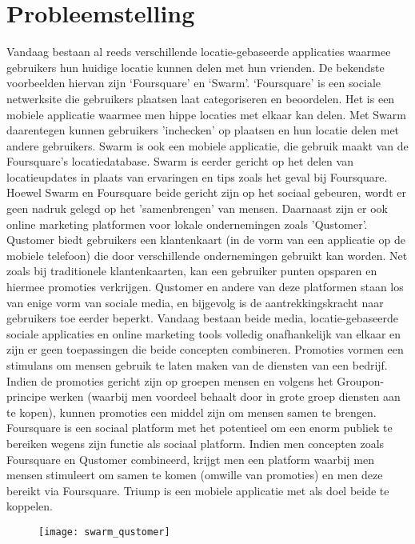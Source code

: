 \chapter{Probleemstelling}
Vandaag bestaan al reeds verschillende locatie-gebaseerde applicaties waarmee gebruikers hun huidige locatie kunnen delen met hun vrienden. De bekendste voorbeelden hiervan zijn ‘Foursquare’ en ‘Swarm’. ‘Foursquare’ is een sociale netwerksite die gebruikers plaatsen laat categoriseren en beoordelen. Het is een mobiele applicatie waarmee men hippe locaties met elkaar kan delen. Met Swarm daarentegen kunnen gebruikers 'inchecken' op plaatsen en hun locatie delen met andere gebruikers. Swarm is ook een mobiele applicatie, die gebruik maakt van de Foursquare's locatiedatabase. Swarm is eerder gericht op het delen van locatieupdates in plaats van ervaringen en tips zoals het geval bij Foursquare.
Hoewel Swarm en Foursquare beide gericht zijn op het sociaal gebeuren, wordt er geen nadruk gelegd op het 'samenbrengen' van mensen. 
Daarnaast zijn er ook online marketing platformen voor lokale ondernemingen zoals 'Qustomer'. Qustomer biedt gebruikers een klantenkaart (in de vorm van een applicatie op de mobiele telefoon) die door verschillende ondernemingen gebruikt kan worden. Net zoals bij traditionele klantenkaarten, kan een gebruiker punten opsparen en hiermee promoties verkrijgen. Qustomer en andere van deze platformen staan los van enige vorm van sociale media, en bijgevolg is de aantrekkingskracht naar gebruikers toe eerder beperkt.
Vandaag bestaan beide media, locatie-gebaseerde sociale applicaties en online marketing tools volledig onafhankelijk van elkaar en zijn er geen toepassingen die beide concepten combineren. 
Promoties vormen een stimulans om mensen gebruik te laten maken van de diensten van een bedrijf. Indien de promoties gericht zijn op groepen mensen en volgens het Groupon-principe werken (waarbij men voordeel behaalt door in grote groep diensten aan te kopen), kunnen promoties een middel zijn om mensen samen te brengen.
Foursquare is een sociaal platform met het potentieel om een enorm publiek te bereiken wegens zijn functie als sociaal platform.
Indien men concepten zoals Foursquare en Qustomer combineerd, krijgt men een platform waarbij men mensen stimuleert om samen te komen (omwille van promoties) en men deze bereikt via Foursquare.
Triump is een mobiele applicatie met als doel beide te koppelen. 
\begin{figure}[H]
	\centering
	\texttt{[image: swarm\_qustomer]}
	\label{fig:probleemstelling}
	
\end{figure}



